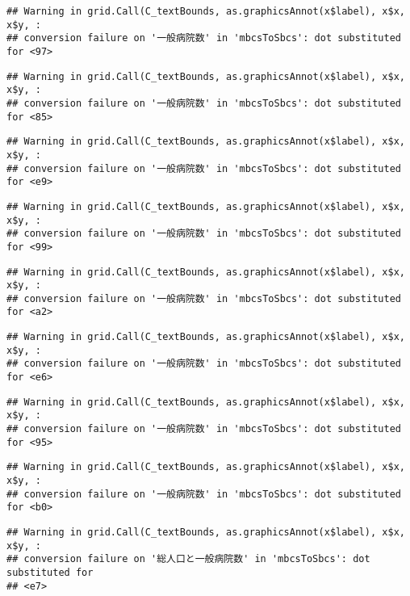 \documentclass[
]{article}
\begin{document}
\begin{verbatim}
## Warning in grid.Call(C_textBounds, as.graphicsAnnot(x$label), x$x, x$y, :
## conversion failure on '一般病院数' in 'mbcsToSbcs': dot substituted for <97>
\end{verbatim}

\begin{verbatim}
## Warning in grid.Call(C_textBounds, as.graphicsAnnot(x$label), x$x, x$y, :
## conversion failure on '一般病院数' in 'mbcsToSbcs': dot substituted for <85>
\end{verbatim}

\begin{verbatim}
## Warning in grid.Call(C_textBounds, as.graphicsAnnot(x$label), x$x, x$y, :
## conversion failure on '一般病院数' in 'mbcsToSbcs': dot substituted for <e9>
\end{verbatim}

\begin{verbatim}
## Warning in grid.Call(C_textBounds, as.graphicsAnnot(x$label), x$x, x$y, :
## conversion failure on '一般病院数' in 'mbcsToSbcs': dot substituted for <99>
\end{verbatim}

\begin{verbatim}
## Warning in grid.Call(C_textBounds, as.graphicsAnnot(x$label), x$x, x$y, :
## conversion failure on '一般病院数' in 'mbcsToSbcs': dot substituted for <a2>
\end{verbatim}

\begin{verbatim}
## Warning in grid.Call(C_textBounds, as.graphicsAnnot(x$label), x$x, x$y, :
## conversion failure on '一般病院数' in 'mbcsToSbcs': dot substituted for <e6>
\end{verbatim}

\begin{verbatim}
## Warning in grid.Call(C_textBounds, as.graphicsAnnot(x$label), x$x, x$y, :
## conversion failure on '一般病院数' in 'mbcsToSbcs': dot substituted for <95>
\end{verbatim}

\begin{verbatim}
## Warning in grid.Call(C_textBounds, as.graphicsAnnot(x$label), x$x, x$y, :
## conversion failure on '一般病院数' in 'mbcsToSbcs': dot substituted for <b0>
\end{verbatim}

\begin{verbatim}
## Warning in grid.Call(C_textBounds, as.graphicsAnnot(x$label), x$x, x$y, :
## conversion failure on '総人口と一般病院数' in 'mbcsToSbcs': dot substituted for
## <e7>
\end{verbatim}
\end{document}
